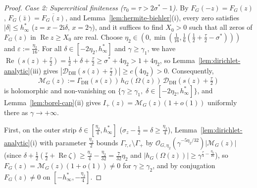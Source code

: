 \documentclass[11pt,a4paper,reqno]{amsart}
\theoremstyle{definition}
\theoremstyle{remark}
\numberwithin{equation}{section}
\newcommand{\ii}{\mathrm{i}}
\DeclareMathOperator{\Reop}{Re}
\begin{document}
\begin{proof}
\emph{Case 2: Supercritical finiteness ($\tau_0 = \tau > 2\sigma^* - 1$).} By $F_G(-z) = F_G(z)$, $F_G(\bar{z}) = \overline{F_G(z)}$, and Lemma~\ref{lem:hermite-biehler}(i), every zero satisfies $|\delta| \le h_\infty^*$ ($z = x - 2\ii\delta$, $x = 2\gamma$), and it suffices to find $X_0 > 0$ such that all zeros of $F_G(z)$ in $\Reop z \ge X_0$ are real. Choose $\eta_2 \in (0, \min(\frac{1}{16}, \frac{1}{6}(\frac{1}{2} + \frac{\tau}{2} - \sigma^*)))$ and $\varepsilon := \frac{\eta_2}{16}$. For all $\delta \in [-2\eta_2, h_\infty^*]$ and $\gamma \ge \gamma_1$, we have $\Reop(s(z) + \frac{\tau}{2}) = \frac{1}{2} + \delta + \frac{\tau}{2} \ge \sigma^* + 4\eta_2 > 1 + 4\eta_2$, so Lemma~\ref{lem:dirichlet-analytic}(iii) gives $|\mathcal{D}_{\mathrm{DH}}(s(z) + \frac{\tau}{2})| \ge c(4\eta_2) > 0$. Consequently,
\begin{equation}
  \mathcal{M}_G(z) := \Gamma_{\mathrm{DH}}(s(z))\,h_G(\Omega(z))\,\mathcal{D}_{\mathrm{DH}}\!\left(s(z) + \tfrac{\tau}{2}\right)
  \label{eq:supercritical-split}
\end{equation}
is holomorphic and non-vanishing on $\{\gamma \ge \gamma_1,\; \delta \in [-2\eta_2, h_\infty^*]\}$, and Lemma~\ref{lem:borel-cap}(ii) gives $I_+(z) = \mathcal{M}_G(z)(1 + o(1))$ uniformly there as $\gamma \to +\infty$.

First, on the outer strip $\delta \in [\frac{\eta_2}{4}, h_\infty^*]$ ($\sigma_z - \frac{1}{2} = \delta \ge \frac{\eta_2}{4}$), Lemma~\ref{lem:dirichlet-analytic}(i) with parameter $\frac{\eta_2}{2}$ bounds $\Gamma_{\tau,\varepsilon} \setminus \Gamma_+$ by $\mathcal{O}_{G,\eta_2}(\gamma^{-5\eta_2/32})|\mathcal{M}_G(z)|$ (since $\delta + \frac{1}{2}(\frac{\tau}{2} + \Reop\zeta) \ge \frac{\eta_2}{4} - \frac{\eta_2}{32} = \frac{7}{32}\eta_2$ and $|h_G(\Omega(z))| \ge \gamma^{\frac{\tau}{4} - \frac{\eta_2}{16}}$), so $F_G(z) = \mathcal{M}_G(z)(1 + o(1)) \ne 0$ for $\gamma \ge \gamma_2$, and by conjugation $F_G(z) \ne 0$ on $[-h_\infty^*, -\frac{\eta_2}{4}]$.


\end{proof}
\end{document}
